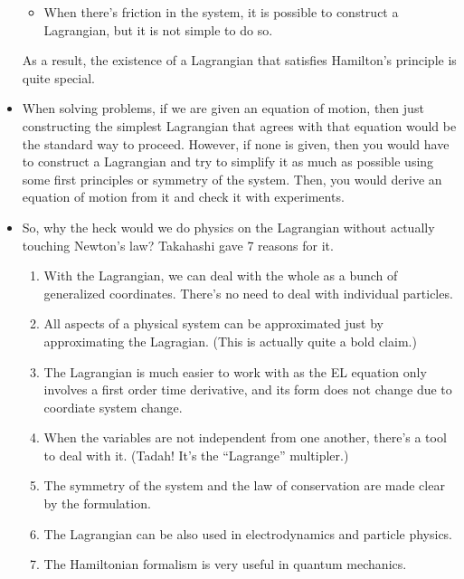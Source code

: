 \documentclass[10pt]{article}
\begin{document}
\begin{itemize}
\begin{itemize}
  		\item When there's friction in the system, it is possible to construct a Lagrangian, but it is not simple to do so.
  	\end{itemize}
  	As a result, the existence of a Lagrangian that satisfies Hamilton's principle is quite special.

  	\item When solving problems, if we are given an equation of motion, then just constructing the simplest Lagrangian that agrees with that equation would be the standard way to proceed. However, if none is given, then you would have to construct a Lagrangian and try to simplify it as much as possible using some first principles or symmetry of the system. Then, you would derive an equation of motion from it and check it with experiments.

  	\item So, why the heck would we do physics on the Lagrangian without actually touching Newton's law? Takahashi gave 7 reasons for it.
  	\begin{enumerate}
  		\item With the Lagrangian, we can deal with the whole as a bunch of generalized coordinates. There's no need to deal with individual particles.

  		\item All aspects of a physical system can be approximated just by approximating the Lagragian. (This is actually quite a bold claim.)

  		\item The Lagrangian is much easier to work with as the EL equation only involves a first order time derivative, and its form does not change due to coordiate system change.

  		\item When the variables are not independent from one another, there's a tool to deal with it. (Tadah! It's the ``Lagrange'' multipler.)

  		\item The symmetry of the system and the law of conservation are made clear by the formulation.

  		\item The Lagrangian can be also used in electrodynamics and particle physics.

  		\item The Hamiltonian formalism is very useful in quantum mechanics.
  	\end{enumerate}
  \end{itemize}


  
    
\end{document}
